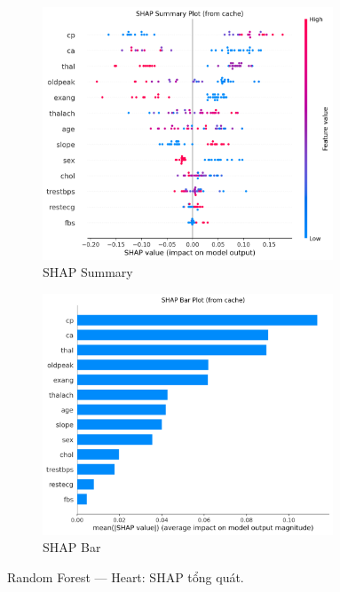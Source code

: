 \begin{figure}[H]
\centering
\begin{subfigure}[b]{0.48\textwidth}
\centering
\includegraphics[width=0.95\textwidth]{Result/heart_dataset/RF/SHAP/Summary.png}
\caption{SHAP Summary}
\label{fig:rf_heart_shap_summary}
\end{subfigure}\hfill
\begin{subfigure}[b]{0.48\textwidth}
\centering
\includegraphics[width=0.95\textwidth]{Result/heart_dataset/RF/SHAP/Bar.png}
\caption{SHAP Bar}
\label{fig:rf_heart_shap_bar}
\end{subfigure}
\caption{Random Forest — Heart: SHAP tổng quát.}
\label{fig:rf_heart_shap_overview}
\end{figure}

